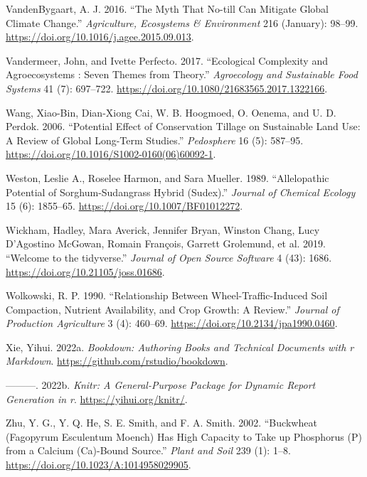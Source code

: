 \documentclass[
  12pt,
]{article}
\newlength{\cslhangindent}
\newlength{\cslentryspacingunit} %
\newenvironment{CSLReferences}[2] %
 {%
  \setlength{\parindent}{0pt}
  \ifodd #1
  \let\oldpar\par
  \def\par{\hangindent=\cslhangindent\oldpar}
  \fi
  \setlength{\parskip}{#2\cslentryspacingunit}
 }%
 {}
\begin{document}
\begin{CSLReferences}{1}{0}
\leavevmode{}%
VandenBygaart, A. J. 2016. {``The Myth That No-till Can Mitigate Global Climate Change.''} \emph{Agriculture, Ecosystems \& Environment} 216 (January): 98--99. \url{https://doi.org/10.1016/j.agee.2015.09.013}.

\leavevmode{}%
Vandermeer, John, and Ivette Perfecto. 2017. {``Ecological Complexity and Agroecosystems : Seven Themes from Theory.''} \emph{Agroecology and Sustainable Food Systems} 41 (7): 697--722. \url{https://doi.org/10.1080/21683565.2017.1322166}.

\leavevmode{}%
Wang, Xiao-Bin, Dian-Xiong Cai, W. B. Hoogmoed, O. Oenema, and U. D. Perdok. 2006. {``Potential {Effect} of {Conservation Tillage} on {Sustainable Land Use}: {A Review} of {Global Long-Term Studies}.''} \emph{Pedosphere} 16 (5): 587--95. \url{https://doi.org/10.1016/S1002-0160(06)60092-1}.

\leavevmode{}%
Weston, Leslie A., Roselee Harmon, and Sara Mueller. 1989. {``Allelopathic Potential of Sorghum-Sudangrass Hybrid (Sudex).''} \emph{Journal of Chemical Ecology} 15 (6): 1855--65. \url{https://doi.org/10.1007/BF01012272}.

\leavevmode{}%
Wickham, Hadley, Mara Averick, Jennifer Bryan, Winston Chang, Lucy D'Agostino McGowan, Romain François, Garrett Grolemund, et al. 2019. {``Welcome to the {tidyverse}.''} \emph{Journal of Open Source Software} 4 (43): 1686. \url{https://doi.org/10.21105/joss.01686}.

\leavevmode{}%
Wolkowski, R. P. 1990. {``Relationship Between {Wheel-Traffic-Induced Soil Compaction}, {Nutrient Availability}, and {Crop Growth}: {A Review}.''} \emph{Journal of Production Agriculture} 3 (4): 460--69. \url{https://doi.org/10.2134/jpa1990.0460}.

\leavevmode{}%
Xie, Yihui. 2022a. \emph{Bookdown: Authoring Books and Technical Documents with r Markdown}. \url{https://github.com/rstudio/bookdown}.

\leavevmode{}%
---------. 2022b. \emph{Knitr: A General-Purpose Package for Dynamic Report Generation in r}. \url{https://yihui.org/knitr/}.

\leavevmode{}%
Zhu, Y. G., Y. Q. He, S. E. Smith, and F. A. Smith. 2002. {``Buckwheat ({Fagopyrum} Esculentum {Moench}) Has High Capacity to Take up Phosphorus ({P}) from a Calcium ({Ca})-Bound Source.''} \emph{Plant and Soil} 239 (1): 1--8. \url{https://doi.org/10.1023/A:1014958029905}.

\end{CSLReferences}
\end{document}
